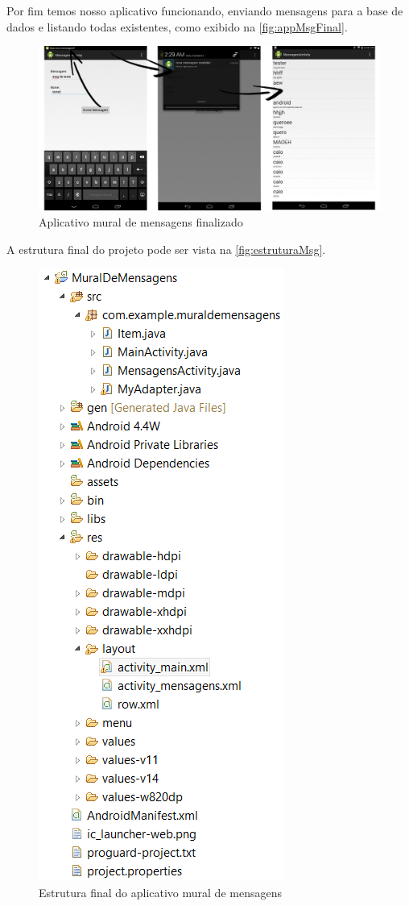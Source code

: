 \documentclass[a4paper,12pt,brazil,oneside]{book}
\begin{document}
Por fim temos nosso aplicativo funcionando, enviando mensagens para a base de dados e listando todas existentes, como exibido na \autoref{fig:appMsgFinal}.

\begin{figure}[H]
  \centering
  \includegraphics[width=1\textwidth]{figuras/devapp/muraldemensagens/appMsg.png}
  \caption{Aplicativo mural de mensagens finalizado}
  \label{fig:appMsgFinal}
\end{figure}

A estrutura final do projeto pode ser vista na \autoref{fig:estruturaMsg}.

\begin{figure}[H]
  \centering
  \includegraphics[width=.35\textwidth]{figuras/devapp/muraldemensagens/estrutura.png}
  \caption{Estrutura final do aplicativo mural de mensagens}
  \label{fig:estruturaMsg}
\end{figure}

\singlespace
{}
\cleardoublepage
\thispagestyle{empty}
{}


\doublespace
\end{document}
